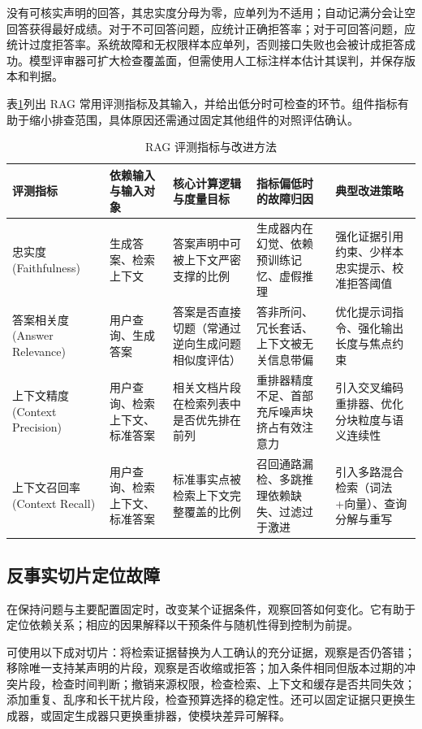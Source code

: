 \documentclass[../textbook.tex]{subfiles}
\begin{document}
没有可核实声明的回答，其忠实度分母为零，应单列为不适用；自动记满分会让空回答获得最好成绩。对于不可回答问题，应统计正确拒答率；对于可回答问题，应统计过度拒答率。系统故障和无权限样本应单列，否则接口失败也会被计成拒答成功。模型评审器可扩大检查覆盖面，但需使用人工标注样本估计其误判，并保存版本和判据。

表\ref{tab:rag-evaluation-framework}列出 RAG 常用评测指标及其输入，并给出低分时可检查的环节。组件指标有助于缩小排查范围，具体原因还需通过固定其他组件的对照评估确认。

\begin{table}[htbp]
\centering
\caption{RAG 评测指标与改进方法}
\label{tab:rag-evaluation-framework}
\begin{tabularx}{\linewidth}{@{}lXXXX@{}}
\toprule
评测指标 & 依赖输入与输入对象 & 核心计算逻辑与度量目标 & 指标偏低时的故障归因 & 典型改进策略 \\
\midrule
忠实度 (Faithfulness) & 生成答案、检索上下文 & 答案声明中可被上下文严密支撑的比例 & 生成器内在幻觉、依赖预训练记忆、虚假推理 & 强化证据引用约束、少样本忠实提示、校准拒答阈值 \\
答案相关度 (Answer Relevance) & 用户查询、生成答案 & 答案是否直接切题（常通过逆向生成问题相似度评估） & 答非所问、冗长套话、上下文被无关信息带偏 & 优化提示词指令、强化输出长度与焦点约束 \\
上下文精度 (Context Precision) & 用户查询、检索上下文、标准答案 & 相关文档片段在检索列表中是否优先排在前列 & 重排器精度不足、首部充斥噪声块挤占有效注意力 & 引入交叉编码重排器、优化分块粒度与语义连续性 \\
上下文召回率 (Context Recall) & 用户查询、检索上下文、标准答案 & 标准事实点被检索上下文完整覆盖的比例 & 召回通路漏检、多跳推理依赖缺失、过滤过于激进 & 引入多路混合检索（词法+向量）、查询分解与重写 \\
\bottomrule
\end{tabularx}
\end{table}

\subsection{反事实切片定位故障}
在保持问题与主要配置固定时，改变某个证据条件，观察回答如何变化。它有助于定位依赖关系；相应的因果解释以干预条件与随机性得到控制为前提。

可使用以下成对切片：将检索证据替换为人工确认的充分证据，观察是否仍答错；移除唯一支持某声明的片段，观察是否收缩或拒答；加入条件相同但版本过期的冲突片段，检查时间判断；撤销来源权限，检查检索、上下文和缓存是否共同失效；添加重复、乱序和长干扰片段，检查预算选择的稳定性。还可以固定证据只更换生成器，或固定生成器只更换重排器，使模块差异可解释。
\end{document}
